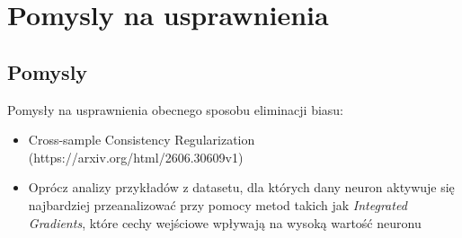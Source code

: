 \chapter{Pomysly na usprawnienia}
\label{chap:pomysly}

\section{Pomysly}

Pomysły na usprawnienia obecnego sposobu eliminacji biasu:
\begin{itemize}
    \item Cross-sample Consistency Regularization (https://arxiv.org/html/2606.30609v1)
    \item Oprócz analizy przykładów z datasetu, dla których dany neuron aktywuje się najbardziej przeanalizować przy pomocy metod takich jak \textit{Integrated Gradients}, które cechy wejściowe wpływają na wysoką wartość neuronu
\end{itemize}